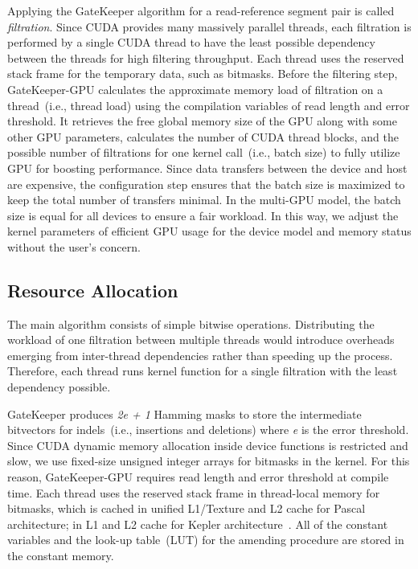 Applying the GateKeeper algorithm for a read-reference segment pair is called \textit{filtration}. Since CUDA provides many massively parallel threads, each filtration is performed by a single CUDA thread to have the least possible dependency between the threads for high filtering throughput. Each thread uses the reserved stack frame for the temporary data, such as bitmasks. Before the filtering step, GateKeeper-GPU calculates the approximate memory load of filtration on a thread~(i.e., thread load) using the compilation variables of read length and error threshold. It retrieves the free global memory size of the GPU along with some other GPU parameters, calculates the number of CUDA thread blocks, and the possible number of filtrations for one kernel call~(i.e., batch size) to fully utilize GPU for boosting performance. Since data transfers between the device and host are expensive, the configuration step ensures that the batch size is maximized to keep the total number of transfers minimal. In the multi-GPU model, the batch size is equal for all devices to ensure a fair workload. In this way, we adjust the kernel parameters of efficient GPU usage for the device model and memory status without the user’s concern.

\subsection{Resource Allocation}
The main algorithm consists of simple bitwise operations. Distributing the workload of one filtration between multiple threads would introduce overheads emerging from inter-thread dependencies rather than speeding up the process. Therefore, each thread runs kernel function for a single filtration with the least dependency possible. 

GateKeeper produces \textit{2e + 1} Hamming masks to store the intermediate bitvectors for indels~(i.e., insertions and deletions) where \textit{e} is the error threshold. Since CUDA dynamic memory allocation inside device functions is restricted and slow, we use fixed-size unsigned integer arrays for bitmasks in the kernel. For this reason, GateKeeper-GPU requires read length and error threshold at compile time. Each thread uses the reserved stack frame in thread-local memory for bitmasks, which is cached in unified L1/Texture and L2 cache for Pascal architecture; in L1 and L2 cache for Kepler architecture~\cite{programmingGuide}. All of the constant variables and the look-up table~(LUT) for the amending procedure are stored in the constant memory.

